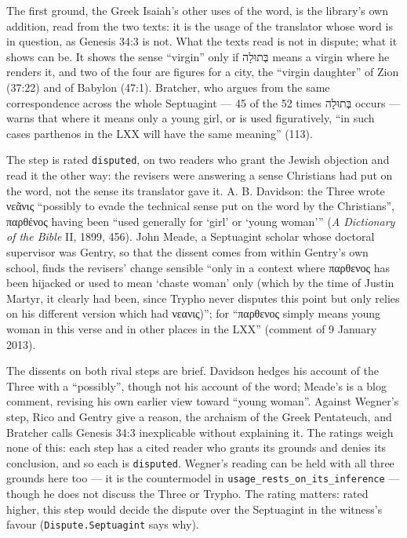 \documentclass[11pt]{article}
\begin{document}
The first ground, the Greek Isaiah’s other uses of the word, is the library’s own addition, read from the two texts: it is the usage of the translator whose word is in question, as Genesis 34:3 is not. What the texts read is not in dispute; what it shows can be. It shows the sense “virgin” only if בְּתוּלָה means a virgin where he renders it, and two of the four are figures for a city, the “virgin daughter” of Zion (37:22) and of Babylon (47:1). Bratcher, who argues from the same correspondence across the whole Septuagint — 45 of the 52 times בְּתוּלָה occurs — warns that where it means only a young girl, or is used figuratively, “in such cases parthenos in the LXX will have the same meaning” (113).

The step is rated \texttt{disputed}, on two readers who grant the Jewish objection and read it the other way: the revisers were answering a sense Christians had put on the word, not the sense its translator gave it. A. B. Davidson: the Three wrote νεᾶνις “possibly to evade the technical sense put on the word by the Christians”, παρθένος having been “used generally for ‘girl’ or ‘young woman’” (\emph{A Dictionary of the Bible} II, 1899, 456). John Meade, a Septuagint scholar whose doctoral supervisor was Gentry, so that the dissent comes from within Gentry’s own school, finds the revisers’ change sensible “only in a context where παρθενος has been hijacked or used to mean ‘chaste woman’ only (which by the time of Justin Martyr, it clearly had been, since Trypho never disputes this point but only relies on his different version which had νεανις)”; for “παρθενος simply means young woman in this verse and in other places in the LXX” (comment of 9 January 2013).

The dissents on both rival steps are brief. Davidson hedges his account of the Three with a “possibly”, though not his account of the word; Meade’s is a blog comment, revising his own earlier view toward “young woman”. Against Wegner’s step, Rico and Gentry give a reason, the archaism of the Greek Pentateuch, and Bratcher calls Genesis 34:3 inexplicable without explaining it. The ratings weigh none of this: each step has a cited reader who grants its grounds and denies its conclusion, and so each is \texttt{disputed}. Wegner’s reading can be held with all three grounds here too — it is the countermodel in \texttt{usage\_\allowbreak{}rests\_\allowbreak{}on\_\allowbreak{}its\_\allowbreak{}inference} — though he does not discuss the Three or Trypho. The rating matters: rated higher, this step would decide the dispute over the Septuagint in the witness’s favour (\texttt{Dispute.Septuagint} says why).
\end{document}
